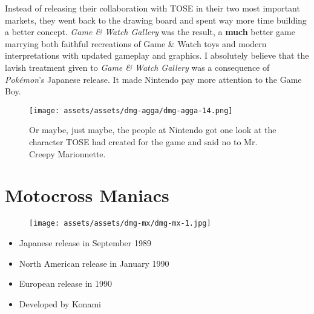 \documentclass{book}
\begin{document}
Instead of releasing their collaboration with TOSE in their two most important markets, they went back to the drawing board and spent way more time building a better concept. \emph{Game \& Watch Gallery} was the result, a \textbf{much} better game marrying both faithful recreations of Game \& Watch toys and modern interpretations with updated gameplay and graphics. I absolutely believe that the lavish treatment given to \emph{Game \& Watch Gallery} was a consequence of \emph{Pokémon}’s Japanese release. It made Nintendo pay more attention to the Game Boy.

\begin{figure}[hbt]
\vskip 10pt
\centering \texttt{[image: assets/assets/dmg-agga/dmg-agga-14.png]}\par\pagetwodescription Or maybe, just maybe, the people at Nintendo got one look at the character TOSE had created for the game and said no to Mr. Creepy Marionnette.
\vskip 6pt
\end{figure}



\begingroup \chapter*{Motocross Maniacs} \endgroup
\begin{figure}[H]
\vskip 4pt
\centering
\texttt{[image: assets/assets/dmg-mx/dmg-mx-1.jpg]}\end{figure}
\begin{itemize} [nosep]




\item Japanese release in September 1989







\item North American release in January 1990







\item European release in 1990












\item Developed by Konami

\end{itemize}\noindent
\end{document}

